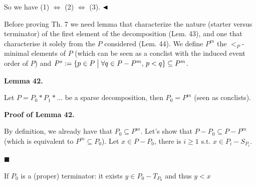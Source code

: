 \documentclass[10pt,a4paper]{article}
\begin{document}
 
  
So we have (1) $\Leftrightarrow$ (2) $\Leftrightarrow$ (3). $\hfill\blacktriangleleft$\par
 
 
 
Before proving Th. 7 we need lemma that characterize the nature (starter versus terminator) of the first element of the decomposition (Lem. 43), and one that characterise it solely from the $P$ considered (Lem. 44). We define $P^{m}$ the $<_{P}$-minimal elements of $P$ (which can be seen as a conclist with the induced event order of $P$) and $P^{s}:={\{p\in P\mathrel{\big{|}}\forall q\in P-P^{m},\,p<q\}}\subseteq P^{m}$.\par
 
 
 
\par\medskip\noindent\textbf{Lemma 42.}\par
 
 
Let $P=P_{0}*P_{1}*\dots$ be a sparse decomposition, then $P_{0}=P^{m}$ (seen as conclists).\par
 
 
 
 
 
\par\medskip\noindent\textbf{Proof of Lemma 42.}\par
 
 
By definition, we already have that $P_{0}\subseteq P^{m}$. Let’s show that $P-P_{0}\subseteq P-P^{m}$ (which is equivalent to $P^{m}\subseteq P_{0}$). Let $x\in P-P_{0}$, there is $i\geqslant 1\text{ s.t.\ }x\in P_{i}-S_{P_{i}}$.\par
  
\par\noindent  $\blacksquare$ 
 
If $P_{0}$ is a (proper) terminator: it exists $y\in P_{0}-T_{P_{0}}$ and thus $y<x$\par
 
 
\end{document}
